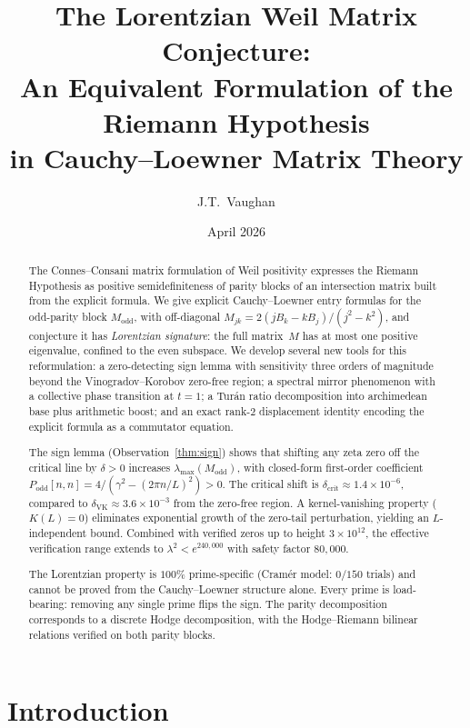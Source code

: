 \documentclass[11pt,a4paper]{article}
\title{The Lorentzian Weil Matrix Conjecture:\\
An Equivalent Formulation of the Riemann Hypothesis\\ in Cauchy--Loewner Matrix Theory}
\author{J.T.\ Vaughan}
\date{April 2026}
\begin{document}
\maketitle

\begin{abstract}
The Connes--Consani matrix formulation of Weil positivity expresses the Riemann Hypothesis as positive semidefiniteness of parity blocks of an intersection matrix built from the explicit formula. We give explicit Cauchy--Loewner entry formulas for the odd-parity block $M_{\mathrm{odd}}$, with off-diagonal $M_{jk} = 2(jB_k - kB_j)/(j^2 - k^2)$, and conjecture it has \emph{Lorentzian signature}: the full matrix~$M$ has at most one positive eigenvalue, confined to the even subspace. We develop several new tools for this reformulation: a zero-detecting sign lemma with sensitivity three orders of magnitude beyond the Vinogradov--Korobov zero-free region; a spectral mirror phenomenon with a collective phase transition at $t = 1$; a Tur\'an ratio decomposition into archimedean base plus arithmetic boost; and an exact rank-$2$ displacement identity encoding the explicit formula as a commutator equation.

The sign lemma (Observation~\ref{thm:sign}) shows that shifting any zeta zero off the critical line by $\delta > 0$ increases $\lambda_{\max}(M_{\mathrm{odd}})$, with closed-form first-order coefficient $P_{\mathrm{odd}}[n,n] = 4/(\gamma^2 - (2\pi n/L)^2) > 0$. The critical shift is $\delta_{\mathrm{crit}} \approx 1.4 \times 10^{-6}$, compared to $\delta_{\mathrm{VK}} \approx 3.6 \times 10^{-3}$ from the zero-free region. A kernel-vanishing property ($K(L) = 0$) eliminates exponential growth of the zero-tail perturbation, yielding an $L$-independent bound. Combined with verified zeros up to height $3 \times 10^{12}$, the effective verification range extends to $\lambda^2 < e^{240{,}000}$ with safety factor $80{,}000$.

The Lorentzian property is $100\%$ prime-specific (Cram\'er model: $0/150$ trials) and cannot be proved from the Cauchy--Loewner structure alone. Every prime is load-bearing: removing any single prime flips the sign. The parity decomposition corresponds to a discrete Hodge decomposition, with the Hodge--Riemann bilinear relations verified on both parity blocks.
\end{abstract}

\section{Introduction}
\end{document}
